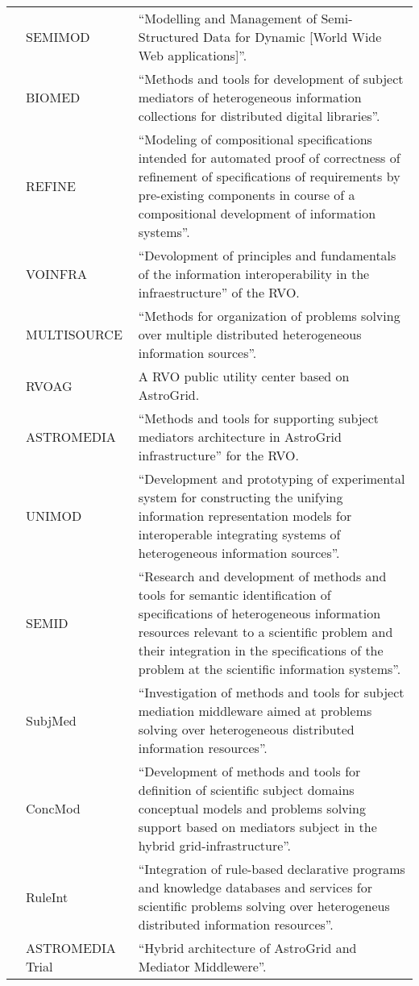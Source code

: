 \begin{table*}[h!t]
\begin{tabular}{|l|p{3cm}|p{12.5cm}|}
			& SEMIMOD & ``Modelling and Management of Semi-Structured Data for Dynamic [World Wide Web applications]''. \\
			& BIOMED & ``Methods and tools for development of subject mediators of he\-te\-ro\-ge\-neous information collections for distributed digital 
								libraries''.\\
			& REFINE & ``Modeling of compositional specifications intended for automated proof of correctness of refinement of specifications of 								requirements by pre-existing components in course of a compositional development of information systems''.\\
			& VOINFRA & ``Devolopment of principles and fundamentals of the information interoperability in the infraestructure'' of the RVO. \\
			& MULTISOURCE & ``Methods for organization of problems solving over multiple distributed heterogeneous information sources''.\\
			& RVOAG & A RVO public utility center based on AstroGrid. \\
			& ASTROMEDIA & ``Methods and tools for supporting subject mediators architecture in AstroGrid infrastructure'' for the RVO.\\
			& UNIMOD & ``Development and prototyping of experimental system for constructing the unifying information representation models for 
								interoperable integrating systems of heterogeneous information sources''.\\
			& SEMID & ``Research and development of methods and tools for semantic identification of specifications of heterogeneous information resources 
								relevant to a scientific problem and their integration in the specifications of the problem at the scientific information 
								systems''.\\
			& SubjMed & ``Investigation of methods and tools for subject mediation middleware aimed at problems solving over heterogeneous distributed 
								information resources''.\\
			& ConcMod & ``Development of methods and tools for definition of scientific subject domains conceptual models and problems solving support based 
								on mediators subject in the hybrid grid-infrastructure''.\\
			& RuleInt & ``Integration of rule-based declarative programs and knowledge databases and services for scientific problems solving over 
								heterogeneus distributed information resources''. \\
			& ASTROMEDIA Trial & ``Hybrid architecture of AstroGrid and Mediator Middlewere''. \\

\end{tabular}
\end{table*}
